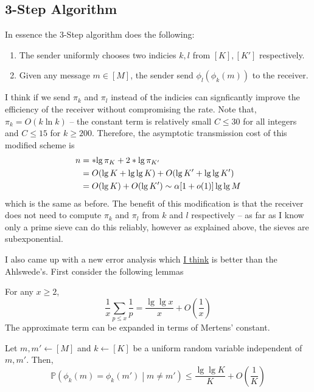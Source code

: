 \documentclass{article}
\begin{document}
\subsection{3-Step Algorithm}
In essence the 3-Step algorithm does the following:
\begin{enumerate}
	\item The sender uniformly chooses two indicies \(k,l\) from \([K],[K']\) respectively.
	\item Given any message \(m \in [M]\), the sender send \(\phi_l(\phi_k(m))\) to the receiver. 
\end{enumerate} 
I think if we send \(\pi_k\) and \(\pi_l\) instead of the indicies can signficantly improve the efficiency of the receiver without compromising the rate. Note that, \(\pi_k = O(k \ln k)\) -- the constant term is relatively small \(C \leq 30\) for all integers and \(C \leq 15\) for \(k \geq 200\). Therefore, the asymptotic transmission cost of this modified scheme is 
\begin{align}
	n &= \ceil{\lg \pi_K} + 2\ceil{\lg \pi_{K'}} \\
	&= O(\lg K + \lg\lg K) + O(\lg K' + \lg \lg K') \\
	&= O(\lg K) + O(\lg K') \sim \alpha [1 + o(1)] \lg \lg M
\end{align}
which is the same as before. The benefit of this modification is that the receiver does not need to compute \(\pi_k\) and \(\pi_l\) from \(k\) and \(l\) respectively -- as far as I know only a prime sieve can do this reliably, however as explained above, the sieves are subexponential. 

I also came up with a new error analysis which \underline{I think} is better than the Ahlswede's. First consider the following lemmas
\begin{lemma}
	For any \(x \geq 2\),
	\begin{equation}
		\frac{1}{x}\sum_{p \leq x} \frac{1}{p} = \dfrac{\lg \lg x}{x} + O(\frac{1}{x})
	\end{equation}
	The approximate term can be expanded in terms of Mertens' constant.
\end{lemma}

\begin{lemma}
	Let \(m,m' \gets [M]\) and \(k \gets [K]\) be a uniform random variable independent of \(m,m'\). Then,
	\begin{equation*}
		\mathbb{P}\left( \phi_k(m) = \phi_k(m')  \middle| m \neq m'  \right) \leq \dfrac{\lg \lg K}{K} + O(\frac{1}{K})
	\end{equation*}
\end{lemma}
\end{document}
